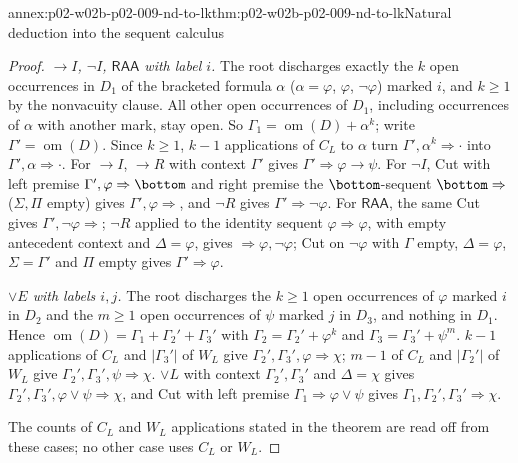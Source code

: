 \begin{annexitem}{annex:p02-w02b-p02-009-nd-to-lk}{thm:p02-w02b-p02-009-nd-to-lk}{Natural deduction into the sequent calculus}
\begin{proof}
\emph{\(\to I\), \(\neg I\), \(\mathsf{RAA}\) with label \(i\).}  The root
discharges exactly the \(k\) open occurrences in \(D_1\) of the bracketed
formula \(\alpha\) (\(\alpha=\varphi\), \(\varphi\), \(\neg\varphi\)) marked
\(i\), and \(k\geq1\) by the nonvacuity clause.  All other open occurrences of
\(D_1\), including occurrences of \(\alpha\) with another mark, stay open.
So \(\Gamma_1=\operatorname{om}(D)+\alpha^{k}\); write
\(\Gamma'=\operatorname{om}(D)\).  Since \(k\geq1\), \(k-1\) applications of
\(C_L\) to \(\alpha\) turn \(\Gamma',\alpha^{k}\Rightarrow\cdot\) into
\(\Gamma',\alpha\Rightarrow\cdot\).  For \(\to I\), \(\to R\) with context
\(\Gamma'\) gives \(\Gamma'\Rightarrow\varphi\to\psi\).  For \(\neg I\), Cut
with left premise \(\Gamma',\varphi\Rightarrow\bottom\) and right premise the
\(\bottom\)-sequent \(\bottom\Rightarrow{}\) (\(\Sigma,\Pi\) empty) gives
\(\Gamma',\varphi\Rightarrow{}\), and \(\neg R\) gives
\(\Gamma'\Rightarrow\neg\varphi\).  For \(\mathsf{RAA}\), the same Cut gives
\(\Gamma',\neg\varphi\Rightarrow{}\); \(\neg R\) applied to the identity
sequent \(\varphi\Rightarrow\varphi\), with empty antecedent context and
\(\Delta=\varphi\), gives \({}\Rightarrow\varphi,\neg\varphi\); Cut on
\(\neg\varphi\) with \(\Gamma\) empty, \(\Delta=\varphi\), \(\Sigma=\Gamma'\)
and \(\Pi\) empty gives \(\Gamma'\Rightarrow\varphi\).

\emph{\(\lor E\) with labels \(i,j\).}  The root discharges the \(k\geq1\)
open occurrences of \(\varphi\) marked \(i\) in \(D_2\) and the \(m\geq1\)
open occurrences of \(\psi\) marked \(j\) in \(D_3\), and nothing in \(D_1\).
Hence \(\operatorname{om}(D)=\Gamma_1+\Gamma_2'+\Gamma_3'\) with
\(\Gamma_2=\Gamma_2'+\varphi^{k}\) and \(\Gamma_3=\Gamma_3'+\psi^{m}\).
\(k-1\) applications of \(C_L\) and \(|\Gamma_3'|\) of \(W_L\) give
\(\Gamma_2',\Gamma_3',\varphi\Rightarrow\chi\); \(m-1\) of \(C_L\) and
\(|\Gamma_2'|\) of \(W_L\) give \(\Gamma_2',\Gamma_3',\psi\Rightarrow\chi\).
\(\lor L\) with context \(\Gamma_2',\Gamma_3'\) and \(\Delta=\chi\) gives
\(\Gamma_2',\Gamma_3',\varphi\lor\psi\Rightarrow\chi\), and Cut with left
premise \(\Gamma_1\Rightarrow\varphi\lor\psi\) gives
\(\Gamma_1,\Gamma_2',\Gamma_3'\Rightarrow\chi\).

The counts of \(C_L\) and \(W_L\) applications stated in the theorem are
read off from these cases; no other case uses \(C_L\) or \(W_L\).
\end{proof}
\end{annexitem}


